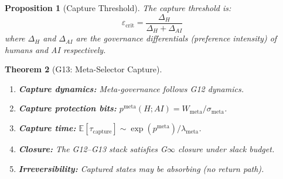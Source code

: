 \documentclass[12pt]{article}
\newtheorem{theorem}{Theorem}[section]
\newtheorem{proposition}[theorem]{Proposition}
\newcommand{\E}{\mathbb{E}}
\begin{document}
\begin{proposition}[Capture Threshold]
\label{prop:capture}
The \emph{capture threshold} is:
\[
\varepsilon_{\mathrm{crit}} = \frac{\Delta_H}{\Delta_H + \Delta_{AI}}
\]
where $\Delta_H$ and $\Delta_{AI}$ are the governance differentials (preference intensity) of humans and AI respectively.
\end{proposition}

\begin{theorem}[G13: Meta-Selector Capture]
\label{thm:g13}
\begin{enumerate}
    \item[(a)] \textbf{Capture dynamics:} Meta-governance follows G12 dynamics.
    \item[(b)] \textbf{Capture protection bits:} $p^{\mathrm{meta}}(H; AI) = W_{\mathrm{meta}} / \sigma_{\mathrm{meta}}$.
    \item[(c)] \textbf{Capture time:} $\E[\tau_{\mathrm{capture}}] \sim \exp(p^{\mathrm{meta}}) / \lambda_{\mathrm{meta}}$.
    \item[(d)] \textbf{Closure:} The G12--G13 stack satisfies G$\infty$ closure under slack budget.
    \item[(e)] \textbf{Irreversibility:} Captured states may be absorbing (no return path).
\end{enumerate}
\end{theorem}
\end{document}
